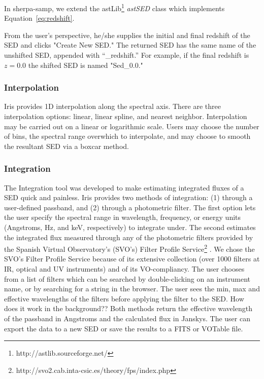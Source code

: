 \documentclass[preprint,12pt,3p]{elsarticle}
\begin{document}
In sherpa-samp, we extend the astLib\footnote{http://astlib.sourceforge.net/} \textit{astSED} class which implements Equation~\ref{eq:redshift}. 

From the user's perspective, he/she supplies the initial and final redshift of the SED and clicks "Create New SED." The returned SED has the same name of the unshifted SED, appended with ``\_redshift.'' For example, if the final redshift is \(z=0.0\) the shifted SED is named "Sed\_0.0."

\subsubsection{Interpolation}
Iris provides 1D interpolation along the spectral axis. There are three interpolation options: linear, linear spline, and nearest neighbor. Interpolation may be carried out on a linear or logarithmic scale. Users may choose the number of bins, the spectral range overwhich to interpolate, and may choose to smooth the resultant SED via a boxcar method.

\subsubsection{Integration}
The Integration tool was developed to make estimating integrated fluxes of a SED quick and painless. Iris provides two methods of integration: (1) through a user-defined passband, and (2) through a photometric filter. The first option lets the user specify the spectral range in wavelength, frequency, or energy units (Angstroms, Hz, and keV, respectively) to integrate under. The second estimates the integrated flux measured through any of the photometric filters provided by the Spanish Virtual Observatory's (SVO's) Filter Profile Service\footnote{http://svo2.cab.inta-csic.es/theory/fps/index.php} \cite{2013arXiv1312.3249S}. We chose the SVO's Filter Profile Service because of its extensive collection (over 1000 filters at IR, optical and UV instruments) and of its VO-compliancy. The user chooses from a list of filters which can be searched by double-clicking on an instrument name, or by searching for a string in the browser. The user sees the min, max and effective wavelengths of the filters before applying the filter to the SED.
How does it work in the background??
Both methods return the effective wavelength of the passband in Angstroms and the calculated flux in Janskys. The user can export the data to a new SED or save the results to a FITS or VOTable file.
\end{document}
